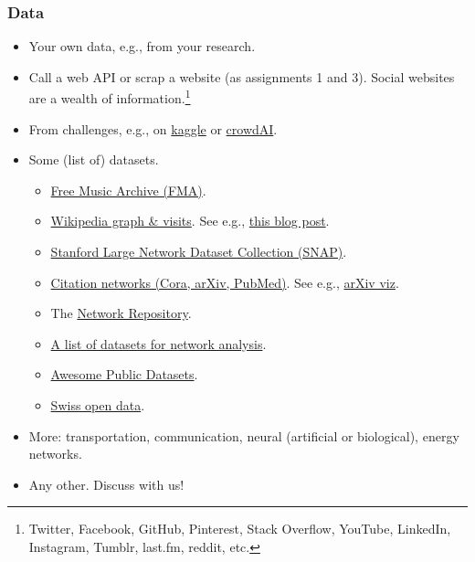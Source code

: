 \documentclass{beamer}
\begin{document}

\begin{frame}
	\frametitle{Data}
	\begin{itemize}
		\small
		\item Your own data, e.g., from your research.
		\vfill
		\item Call a web API or scrap a website (as assignments 1 and 3).
			Social websites are a wealth of information.\footnote{
			Twitter, Facebook, GitHub, Pinterest, Stack Overflow,
			YouTube, LinkedIn, Instagram, Tumblr, last.fm, reddit, etc.}
		\vfill
		\item From challenges, e.g., on \href{https://www.kaggle.com/}{kaggle} or \href{https://www.crowdai.org/}{crowdAI}.
		\vfill
		\item Some (list of) datasets.
			\begin{itemize}
				\scriptsize
				\item \href{https://github.com/mdeff/fma}{Free Music Archive (FMA)}.
				\item \href{https://doi.org/10.5281/zenodo.886484}{Wikipedia graph \& visits}. See e.g., \href{http://blog.miz.space/research/2017/08/14/wikipedia-collective-memory-dynamic-graph-analysis-graphx-spark-scala-time-series-network/}{this blog post}.
				\item \href{http://snap.stanford.edu/data/index.html}{Stanford Large Network Dataset Collection (SNAP)}.
				\item \href{https://linqs.soe.ucsc.edu/node/236}{Citation networks (Cora, arXiv, PubMed)}. See e.g., \href{http://paperscape.org/}{arXiv viz}.
				\item The \href{http://networkrepository.com}{Network Repository}.
				\item \href{https://github.com/briatte/awesome-network-analysis\#datasets}{A list of datasets for network analysis}.
				\item \href{https://github.com/caesar0301/awesome-public-datasets}{Awesome Public Datasets}.
				\item \href{https://opendata.swiss/en/}{Swiss open data}.
			\end{itemize}
		\vfill
		\item More: transportation, communication, neural (artificial or biological), energy networks.
		\item Any other. Discuss with us!
	\end{itemize}
\end{frame}
\end{document}
